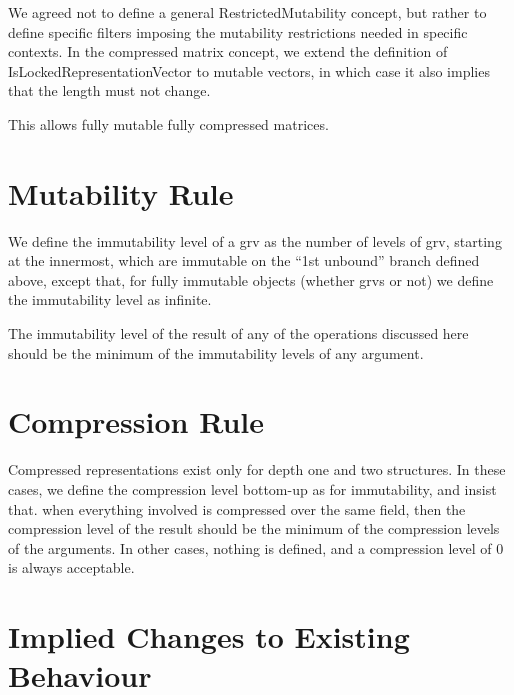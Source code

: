 \documentclass{article}
\begin{document}
We agreed not to define a general RestrictedMutability concept, but
rather to define specific filters imposing the mutability
restrictions needed in specific contexts. In the compressed matrix
concept, we extend the definition of IsLockedRepresentationVector to
mutable vectors, in which case it also implies that the length must
not change.


This allows fully mutable fully compressed matrices.

\section{Mutability Rule}

We define the immutability level of a grv as the number of levels of
grv, starting at the innermost, which are immutable on the ``1st
unbound'' branch defined above, except that, for fully immutable
objects (whether grvs or not) we define the immutability level as
infinite. 

The immutability level of the result of any of the operations
discussed here should be the minimum of the immutability levels of any 
argument.

\section{Compression Rule}

Compressed representations exist only for depth one and two
structures. In these cases, we define the compression level bottom-up
as for immutability, and insist that. when everything involved is
compressed over the same field, then the compression level of the
result should be the minimum of the compression levels of the
arguments. In other cases, nothing is defined, and a compression level 
of 0 is always acceptable.

\section{Implied Changes to Existing Behaviour}
\end{document}
